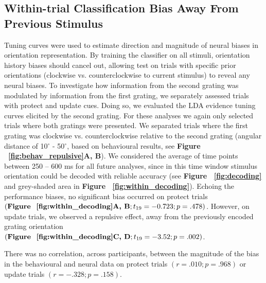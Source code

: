 \documentclass{article}
\begin{document}
\begin{large}
\subsection{Within-trial Classification Bias Away From Previous Stimulus}
Tuning curves were used to estimate direction and magnitude of neural biases in orientation representation. By training the classifier on all stimuli, orientation history biases should cancel out, allowing test on trials with specific prior orientations (clockwise vs. counterclockwise to current stimulus) to reveal any neural biases. To investigate how information from the second grating was modulated by information from the first grating, we separately assessed trials with protect and update cues. Doing so, we evaluated the LDA evidence tuning curves elicited by the second grating. For these analyses we again only selected trials where both gratings were presented. We separated trials where the first grating was clockwise vs. counterclockwise relative to the second grating (angular distance of 10$^{\circ}$ - 50$^{\circ}$, based on behavioural results, see \textbf{Figure ~\ref{fig:behav_repulsive}A, B}). We considered the average of time points between 250 – 600 ms for all future analyses, since in this time window stimulus orientation could be decoded with reliable accuracy (see \textbf{Figure ~\ref{fig:decoding}} and grey-shaded area in \textbf{Figure ~\ref{fig:within_decoding}}). Echoing the performance biases, no significant bias occurred on protect trials $(\text{\textbf{Figure ~\ref{fig:within_decoding}A, B}};  t\textsubscript{19} = -0.723; p = .478)$. However, on update trials, we observed a repulsive effect, away from the previously encoded grating orientation $(\text{\textbf{Figure ~\ref{fig:within_decoding}C, D}}; t\textsubscript{19}  = -3.52; p = .002)$. 

There was no correlation, across participants, between the magnitude of the bias in the behavioural and neural data on protect trials $(r = .010; p = .968)$ or update trials $(r = -.328; p = .158)$.\\



\end{large}
\end{document}
